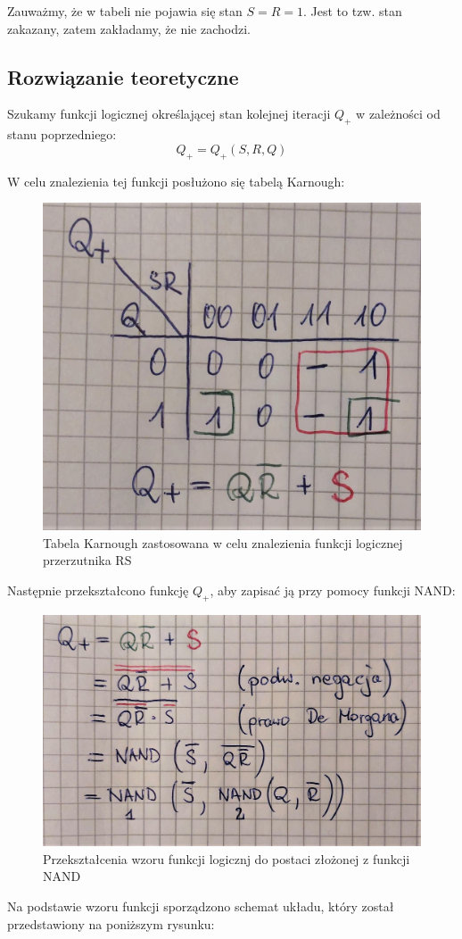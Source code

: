 \documentclass[12pt,a4paper,table]{article}
\begin{document}
    Zauważmy, że w tabeli nie pojawia się stan $S = R = 1$. Jest to tzw. stan zakazany, zatem zakładamy, że nie zachodzi.

    \subsection{Rozwiązanie teoretyczne}

    Szukamy funkcji logicznej określającej stan kolejnej iteracji $Q_+$ w zależności od stanu poprzedniego:
    \begin{equation}
        Q_+ = Q_+(S, R, Q)
    \end{equation}

    W celu znalezienia tej funkcji posłużono się tabelą Karnough:

    \begin{figure}[h]
        \centering
        \includegraphics[width=0.3\linewidth]{images/rs_karnough.jpg}
        \caption{Tabela Karnough zastosowana w celu znalezienia funkcji logicznej przerzutnika RS}
        \label{fig:rs_karnough}
    \end{figure}

    Następnie przekształcono funkcję $Q_+$, aby zapisać ją przy pomocy funkcji NAND:

    \begin{figure}[h]
        \centering
        \includegraphics[width=0.6\linewidth]{images/rs_derivation.jpg}
        \caption{Przekształcenia wzoru funkcji logicznj do postaci złożonej z funkcji NAND}
        \label{fig:rs_derivation}
    \end{figure}

    Na podstawie wzoru funkcji sporządzono schemat układu, który został przedstawiony na poniższym rysunku:
\end{document}
